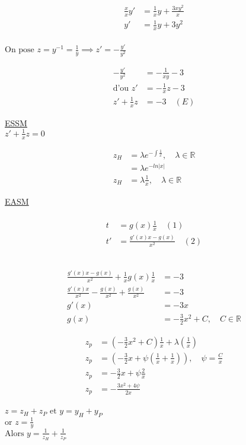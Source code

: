 \begin{align*}
	\frac{x}{x}y' &= \frac{1}{x}y + \frac{3xy^2}{x} \\
	y' &= \frac{1}{x}y + 3y^2 \\
\end{align*}

$\text{On pose } z=y^{-1} = \frac{1}{y} \implies z'= - \frac{y'}{y^2}$

\begin{align*}
	-\frac{y'}{y^2} &= -\frac{1}{xy} - 3 \\
	\text{d'ou } z' &= -\frac{1}{x}z - 3 \\
	z' + \frac{1}{x}z &= -3 \quad (E)
\end{align*}

\underline{ESSM} \\
$z' + \frac{1}{x}z = 0$

\begin{align*}
	z_H &= \lambda e^{-\int \frac{1}{x}}, \quad \lambda \in \mathbb{R} \\
	    &= \lambda e^{-ln|x|} \\
	z_H &= \lambda \frac{1}{x}, \quad \lambda \in \mathbb{R}
\end{align*}

\underline{EASM} \\

 \\
\begin{align*}
	t &= g(x)\frac{1}{x} \quad (1) \\
	t' &= \frac{g'(x)x - g(x)}{x^2} \quad (2)
\end{align*}

 \\
\begin{align*}
	\frac{g'(x)x - g(x)}{x^2} + \frac{1}{x} g(x)\frac{1}{x} &= -3 \\
	\frac{g'(x)x}{x^2} - \frac{g(x)}{x^2} + \frac{g(x)}{x^2} &= -3 \\
	g'(x) &= -3x \\
	g(x) &= -\frac{3}{2}x^2 + C, \quad C \in \mathbb{R}
\end{align*}

\begin{align*}
	z_p &= (-\frac{3}{2} x^2 + C) \frac{1}{x} + \lambda(\frac{1}{x}) \\
	z_p &= (-\frac{3}{2}x + \psi(\frac{1}{x} + \frac{1}{x})), \quad \psi = \frac{C}{x} \\
	z_p &= -\frac{3}{2}x + \psi\frac{2}{x} \\
	z_p &= -\frac{3x^2 + 4\psi}{2x} \\
\end{align*}

$z = z_H + z_P \text{ et } y = y_H + y_P$ \\
$\text{or } z = \frac{1}{y} $ \\
$\text{Alors } y = \frac{1}{z_H} + \frac{1}{z_P} $
